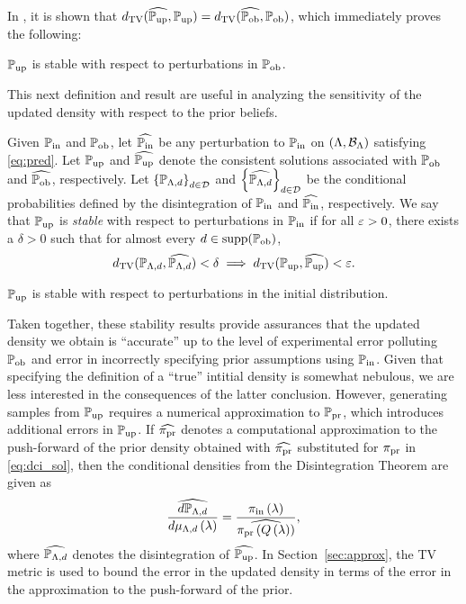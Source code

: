 In \cite{BJW18}, it is shown that $d_{\text{TV}} (\widehat{\operatorname*{\mathbb{P}_{up}}}, \operatorname*{\mathbb{P}_{up}}) = d_{\text{TV}} (\widehat{\operatorname*{\mathbb{P}_{ob}}}, \operatorname*{\mathbb{P}_{ob}})$, which immediately proves the following:

\begin{thm}
  $\operatorname*{\mathbb{P}_{up}}$ is stable with respect to perturbations in $\operatorname*{\mathbb{P}_{ob}}$.
  \label{thm:stableobs}
\end{thm}

This next definition and result are useful in analyzing the sensitivity of the updated density with respect to the prior beliefs.

\begin{defn}\label{defn:stableprior}
  Given $\operatorname*{\mathbb{P}_{in}}$ and $\operatorname*{\mathbb{P}_{ob}}$, let $\widehat{\operatorname*{\mathbb{P}_{in}}}$ be any perturbation to $\operatorname*{\mathbb{P}_{in}}$ on $({\Lambda}, \mathcal{B}_{{\Lambda}})$ satisfying \eqref{eq:pred}. 
  Let $\operatorname*{\mathbb{P}_{up}}$ and $\widehat{\operatorname*{\mathbb{P}_{up}}}$ denote the consistent solutions associated with $\operatorname*{\mathbb{P}_{ob}}$ and $\widehat{\operatorname*{\mathbb{P}_{ob}}}$, respectively. 
  Let $\left\{\mathbb{P}_{{\Lambda}, d}\right\}_{d\in\mathcal{D}}^{}$ and $\left\{\widehat{\mathbb{P}_{{\Lambda}, d}}\right\}_{d\in\mathcal{D}}^{}$ be the conditional probabilities defined by the disintegration of $\operatorname*{\mathbb{P}_{in}}$ and $\widehat{\operatorname*{\mathbb{P}_{in}}}$, respectively. 
  We say that $\operatorname*{\mathbb{P}_{up}}$ is \emph{stable} with respect to perturbations in $\operatorname*{\mathbb{P}_{in}}$ if for all $\varepsilon > 0$, there exists a $\delta > 0$ such that for almost every $d\in\text{supp}(\operatorname*{\mathbb{P}_{ob}})$, 
  \begin{equation}\label{eq:stableprior}
    d_{\text{TV}} (\mathbb{P}_{{\Lambda}, d}, \widehat{\mathbb{P}_{{\Lambda}, d}}) < \delta \implies d_{\text{TV}} (\operatorname*{\mathbb{P}_{up}}, \widehat{\operatorname*{\mathbb{P}_{up}}}) < \varepsilon.
  \end{equation}
\end{defn}

\begin{thm}
  $\operatorname*{\mathbb{P}_{up}}$ is stable with respect to perturbations in the initial distribution.
  \label{thm:stableprior}
\end{thm}

Taken together, these stability results provide assurances that the updated density we obtain is ``accurate'' up to the level of experimental error polluting $\operatorname*{\mathbb{P}_{ob}}$ and error in incorrectly specifying prior assumptions using $\operatorname*{\mathbb{P}_{in}}$. 
Given that specifying the definition of a ``true'' intitial density is somewhat nebulous, we are less interested in the consequences of the latter conclusion.
However, generating samples from $\operatorname*{\mathbb{P}_{up}}$ requires a numerical approximation to $\operatorname*{\mathbb{P}_{pr}}$, which introduces additional errors in $\operatorname*{\mathbb{P}_{up}}$.
If $\widehat{\operatorname*{\pi_{pr}}}$ denotes a computational approximation to the push-forward of the prior density obtained with $\widehat{\operatorname*{\pi_{pr}}}$ substituted for $\operatorname*{\pi_{pr}}$ in \eqref{eq:dci_sol}, then the conditional densities from the Disintegration Theorem are given as
\[
\frac{\widehat{d\mathbb{P}_{{\Lambda}, d}}}{d\mu_{{\Lambda}, d}\left ( \lambda \right )} = \frac{\operatorname*{\pi_{in}}\left ( \lambda \right )}{ \widehat{\operatorname*{\pi_{pr}}\left ( Q\left ( \lambda \right ) \right )} },
\]
where $\widehat{\mathbb{P}_{{\Lambda}, d}}$ denotes the disintegration of $\widehat{\operatorname*{\mathbb{P}_{up}}}$.
In Section~\ref{sec:approx}, the TV metric is used to bound the error in the updated density in terms of the error in the approximation to the push-forward of the prior.



